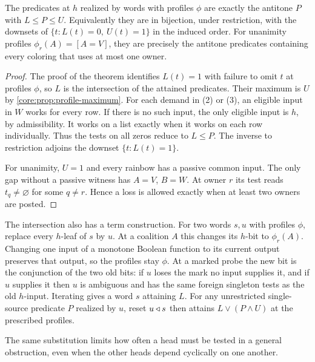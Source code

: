 \begin{corollary}
\label{core:cor:fixed-profile-source}
The predicates at $h$ realized by words with profiles $\phi$ are
exactly the antitone $P$ with $L\le P\le U$. Equivalently they are
in bijection, under restriction, with the downsets of
$\{t:L(t)=0,\ U(t)=1\}$ in the induced order.
For unanimity profiles $\phi_r(A)=[A=V]$, they are precisely the
antitone predicates containing every coloring that uses at most one owner.
\end{corollary}
\begin{proof}
The proof of the theorem identifies $L(t)=1$ with failure to omit
$t$ at profiles $\phi$, so $L$ is the intersection of the attained
predicates. Their maximum is $U$ by \cref{core:prop:profile-maximum}.
For each demand in (2) or (3), an eligible input in $W$ works for
every row. If there is no such input, the only eligible input is $h$,
by admissibility. It works on a list exactly when it works on each
row individually. Thus the tests on all zeros reduce to $L\le P$.
The inverse to restriction adjoins the downset $\{t:L(t)=1\}$.

For unanimity, $U=1$ and every rainbow has a passive common input.
The only gap without a passive witness has $A=V$, $B=W$. At owner
$r$ its test reads $t_q\ne\varnothing$ for some $q\ne r$. Hence a
loss is allowed exactly when at least two owners are posted.
\end{proof}

The intersection also has a term construction. For two words $s,u$
with profiles $\phi$, replace every $h$-leaf of $s$ by $u$.
At a coalition $A$ this changes its $h$-bit to $\phi_r(A)$.
Changing one input of a monotone Boolean function to its current
output preserves that output, so the profiles stay $\phi$. At a
marked probe the new bit is the conjunction of the two old bits:
if $u$ loses the mark no input supplies it, and if $u$ supplies it
then $u$ is ambiguous and has the same foreign singleton tests as
the old $h$-input. Iterating gives a word $s$ attaining $L$. For
any unrestricted single-source predicate $P$ realized by $u$, reset
$u\mathbin{\triangleleft} s$ then attains $L\lor(P\land U)$ at the prescribed profiles.

The same substitution limits how often a head must be tested in a
general obstruction, even when the other heads depend cyclically on
one another.

